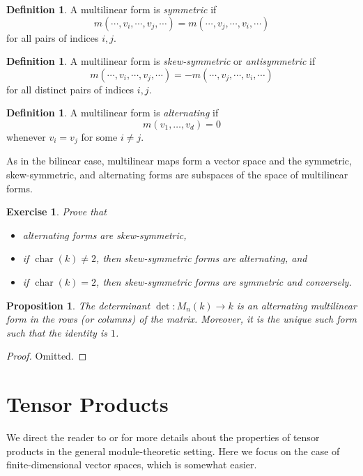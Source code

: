\documentclass[12pt]{article}
\theoremstyle{plain}
\newtheorem{proposition}[theorem]{Proposition}
\newtheorem{exercise}[theorem]{Exercise}
\theoremstyle{definition}
\newtheorem{definition}[theorem]{Definition}
\theoremstyle{remark}
\numberwithin{equation}{section}
\begin{document}
\begin{definition}
A multilinear form is
\emph{symmetric} if
\[
m(\cdots,v_i,\cdots,v_j,\cdots) = m(\cdots,v_j,\cdots,v_i,\cdots)
\]
for all pairs of indices $i,j$.
\end{definition}

\begin{definition}
A multilinear form is \emph{skew-symmetric} or \emph{antisymmetric} if
\[
m(\cdots,v_i,\cdots,v_j,\cdots) = -m(\cdots,v_j,\cdots,v_i,\cdots)
\]
for all distinct pairs of indices $i,j$.
\end{definition}

\begin{definition}
A multilinear form is \emph{alternating} if
\[
m(v_1,\ldots,v_d) = 0
\]
whenever $v_i=v_j$ for some $i \ne j$.
\end{definition}

As in the bilinear case, multilinear maps form a vector space and the
symmetric, skew-symmetric, and alternating forms are subspaces of the
space of multilinear forms.

\begin{exercise}
Prove that
\begin{itemize}
\item alternating forms are skew-symmetric,
\item if $\operatorname{char}(k) \ne 2$, then skew-symmetric forms are
alternating, and
\item if $\operatorname{char}(k) = 2$, then skew-symmetric forms are
symmetric and conversely.
\end{itemize}
\end{exercise}

\begin{proposition}
The determinant $\det : M_n(k) \to k$ is an alternating multilinear form
in the rows (or columns) of the matrix.
Moreover, it is the unique such form such that the identity is $1$.
\end{proposition}

\begin{proof}
Omitted.
\end{proof}

\section{Tensor Products}

We direct the reader to \cite[10.4]{DF} or \cite[XVI]{Lang}
for more details about the properties of tensor products in the general
module-theoretic setting.
Here we focus on the case of finite-dimensional vector spaces,
which is somewhat easier.
\end{document}
